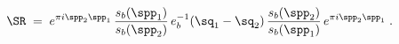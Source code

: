 \begin{equation}
\SR\;=\;e^{\pi i\spp_2\spp_1}\,\frac{s_b(\spp_1)}{s_b(\spp_2)}\,
e_b^{-1}(\sq_1-\sq_2)\,
\frac{s_b(\spp_2)}{s_b(\spp_1)}\,e^{\pi i\spp_2\spp_1}\; .
\end{equation}

